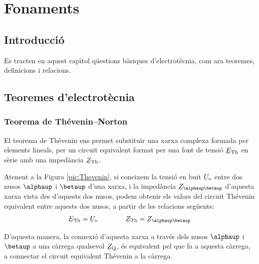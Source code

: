 \chapter{Fonaments}

\section{Introducci\'{o}}
Es tracten en aquest cap\'{\i}tol q\"{u}estions b\`{a}siques
d'electrot\`{e}cnia, com ara teoremes, definicions i relacions.


\section{Teoremes d'electrot\`{e}cnia}\label{sec:teoremes}

\subsection{\texorpdfstring{Teorema de Th\'{e}venin--Norton}{Teorema de
            Th\'{e}venin-Norton}}\label{sec:T_N}

El teorema de Th\'{e}venin ens permet
substituir una xarxa complexa formada per elements lineals, per un
circuit equivalent format per una font de tensi\'{o} $\cmplx{E}\ped{Th}$
en s\`{e}rie amb una imped\`{a}ncia $\cmplx{Z}\ped{Th}$.


Atenent a la Figura \vref{pic:Thevenin}, si coneixem la tensi\'{o} en
buit $\cmplx{U}\ped{o}$ entre dos nusos $\alphaup$ i $\betaup$ d'una
xarxa, i la imped\`{a}ncia $\cmplx{Z}_{\alphaup\betaup}$ d'aquesta xarxa
vista des d'aquests dos nusos, podem obtenir els valors del circuit
Th\'{e}venin equivalent entre aquests dos nusos, a partir de les
relacions seg\"{u}ents:
\begin{equation}
   \cmplx{E}\ped{Th} = \cmplx{U}\ped{o} \qquad\qquad  \cmplx{Z}\ped{Th} = \cmplx{Z}_{\alphaup\betaup}
\end{equation}

D'aquesta manera, la connexi\'{o} d'aquesta xarxa a trav\'{e}s dels nusos
$\alphaup$ i $\betaup$ a una c\`{a}rrega qualsevol $\cmplx{Z}\ped{Q}$, \'{e}s
equivalent pel que fa a aquesta c\`{a}rrega, a connectar el circuit
equivalent Th\'{e}venin a la c\`{a}rrega.
\begin{center}
    
    \label{pic:Thevenin}
\end{center}

